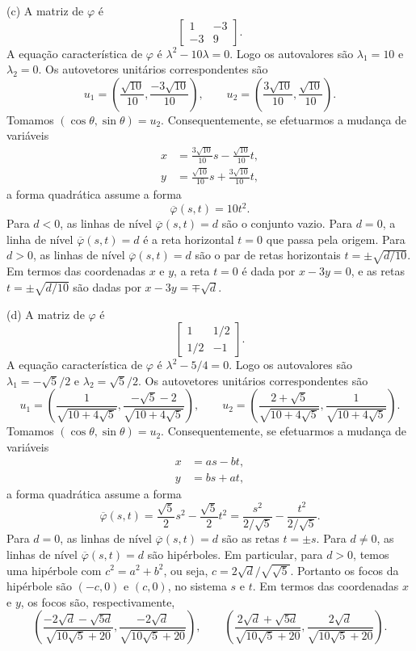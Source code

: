 \documentclass[a4paper,11pt]{article}
\begin{document}
(c)
A matriz de $\varphi$ é
\[
  \begin{bmatrix}
    1 & -3 \\
    -3 & 9
  \end{bmatrix}.
\]
A equação característica de $\varphi$ é $\lambda^2 - 10\lambda = 0$.
Logo os autovalores são $\lambda_1 = 10$ e $\lambda_2 = 0$.
Os autovetores unitários correspondentes são
\[
  u_1 = \left( \frac{\sqrt{10}}{10}, \frac{-3\sqrt{10}}{10} \right), \qquad u_2 = \left( \frac{3\sqrt{10}}{10}, \frac{\sqrt{10}}{10} \right).
\]
Tomamos $(\cos \theta, \sin \theta) = u_2$.
Consequentemente, se efetuarmos a mudança de variáveis
\begin{align*}
  x & = \frac{3\sqrt{10}}{10} s - \frac{\sqrt{10}}{10} t, \\
  y & = \frac{\sqrt{10}}{10} s + \frac{3\sqrt{10}}{10} t,
\end{align*}
a forma quadrática assume a forma
\[
  \overline{\varphi}(s,t) = 10 t^2.
\]
Para $d < 0$, as linhas de nível $\overline{\varphi}(s,t) = d$ são o conjunto vazio.
Para $d = 0$, a linha de nível $\overline{\varphi}(s,t) = d$ é a reta horizontal $t = 0$ que passa pela origem.
Para $d > 0$, as linhas de nível $\overline{\varphi}(s,t) = d$ são o par de retas horizontais $t = \pm \sqrt{d/10}$.
Em termos das coordenadas $x$ e $y$, a reta $t = 0$ é dada por $x - 3y = 0$, e as retas $t = \pm \sqrt{d/10}$ são dadas por $x - 3y = \mp \sqrt{d}$.

(d)
A matriz de $\varphi$ é
\[
  \begin{bmatrix}
    1 & 1/2 \\
    1/2 & -1
  \end{bmatrix}.
\]
A equação característica de $\varphi$ é $\lambda^2 - 5/4 = 0$.
Logo os autovalores são $\lambda_1 = -\sqrt{5}/2$ e $\lambda_2 = \sqrt{5}/2$.
Os autovetores unitários correspondentes são
\[
  u_1 = \left( \frac{1}{\sqrt{10 + 4\sqrt{5}}}, \frac{-\sqrt{5}-2}{\sqrt{10 + 4\sqrt{5}}} \right), \qquad u_2 = \left( \frac{2+\sqrt{5}}{\sqrt{10 + 4\sqrt{5}}}, \frac{1}{\sqrt{10 + 4\sqrt{5}}} \right).
\]
Tomamos $(\cos \theta, \sin \theta) = u_2$.
Consequentemente, se efetuarmos a mudança de variáveis
\begin{align*}
  x & = a s - b t, \\
  y & = b s + a t,
\end{align*}
a forma quadrática assume a forma
\[
  \overline{\varphi}(s,t) = \frac{\sqrt{5}}{2} s^2 - \frac{\sqrt{5}}{2} t^2 = \frac{s^2}{2/\sqrt{5}} - \frac{t^2}{2/\sqrt{5}}.
\]
Para $d = 0$, as linhas de nível $\overline{\varphi}(s,t) = d$ são as retas $t = \pm s$.
Para $d \neq 0$, as linhas de nível $\overline{\varphi}(s,t) = d$ são hipérboles.
Em particular, para $d > 0$, temos uma hipérbole com $c^2 = a^2 + b^2$, ou seja, $c = 2\sqrt{d}/\sqrt{\sqrt{5}}$.
Portanto os focos da hipérbole são $(-c,0)$ e $(c,0)$, no sistema $s$ e $t$.
Em termos das coordenadas $x$ e $y$, os focos são, respectivamente,
\[
  \left( \frac{-2\sqrt{d} -\sqrt{5d}}{\sqrt{10 \sqrt{5} + 20}}, \frac{-2\sqrt{d}}{\sqrt{10 \sqrt{5} + 20}} \right), \qquad \left( \frac{2\sqrt{d} + \sqrt{5d}}{\sqrt{10 \sqrt{5} + 20}}, \frac{2\sqrt{d}}{\sqrt{10 \sqrt{5} + 20}} \right).
\]
\end{document}
